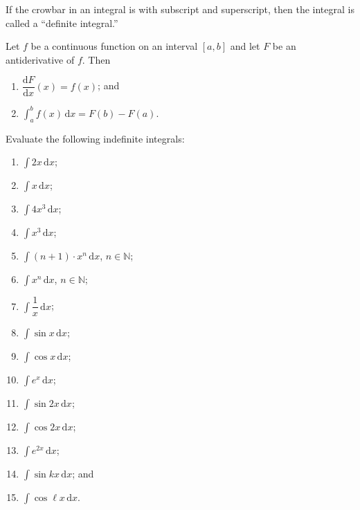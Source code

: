 \documentclass[11pt]{article}
\theoremstyle{break}
\theoremstyle{no_label}
\newcommand{\derivative}[2]{\dfrac{\dd{#1}}{\dd{#2}}}
\newcommand{\dd}{\text{d}}
\newcommand{\ddi}{\text{$\,$d}}
\newcommand{\bbN}{\mathbb{N}}
\numberwithin{equation}{theorem}
\begin{document}
\begin{remark}
    If the crowbar in an integral is with subscript and superscript, then the integral is called a ``definite integral.''
\end{remark}

\begin{theorem}
    Let $f$ be a continuous function on an interval $[a, b]$ and let $F$ be an antiderivative of $f$. Then
    \begin{enumerate}
        \item $\derivative{F}{x}(x)=f(x)$; and
        \item $\displaystyle\int_a^b f(x)\ddi x=F(b)-F(a)$.
    \end{enumerate}
\end{theorem}

\newpage

\begin{example}
    Evaluate the following indefinite integrals:\vspace{-1.8em}
    \begin{multicols}{3}
        \begin{enumerate}
            \item $\displaystyle\int 2x\ddi x$;
            \item $\displaystyle\int x\ddi x$;
            \item $\displaystyle\int 4x^3\ddi x$;
            \item $\displaystyle\int x^3\ddi x$;
            \item $\displaystyle\int (n+1)\cdot x^n\ddi x$, $n\in\bbN$;
            \item $\displaystyle\int x^n\ddi x$, $n\in\bbN$;
            \item $\displaystyle\int \dfrac{1}{x}\ddi x$;
            \item $\displaystyle\int \sin x\ddi x$;
            \item $\displaystyle\int \cos x\ddi x$;
            \item $\displaystyle\int e^x\ddi x$;
            \item $\displaystyle\int \sin 2x\ddi x$;
            \item $\displaystyle\int \cos 2x\ddi x$;
            \item $\displaystyle\int e^{2x}\ddi x$;
            \item $\displaystyle\int \sin kx\ddi x$; and
            \item $\displaystyle\int \cos \ell x\ddi x$.
        \end{enumerate}
    \end{multicols}\vspace{0.1em}
\end{example}
\end{document}
